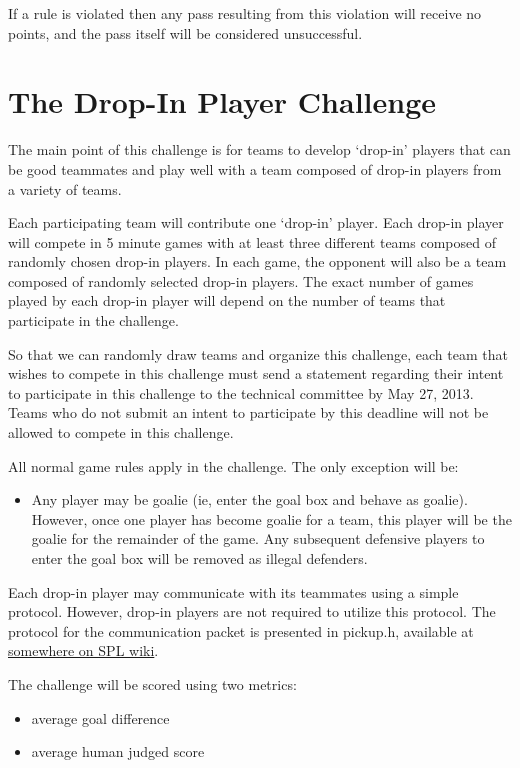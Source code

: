 \documentclass{article}
\begin{document}
If a rule is violated then any pass resulting from this violation will receive no points, and the pass itself will be considered unsuccessful.


\section{The Drop-In Player Challenge}
\label{sec:dropIn}
The main point of this challenge is for teams to develop `drop-in' players that can be good teammates and play well with a team composed of drop-in players from a variety of teams.

Each participating team will contribute one `drop-in' player.  Each drop-in player will compete in 5 minute games with at least three different teams composed of randomly chosen drop-in players.  In each game, the opponent will also be a team composed of randomly selected drop-in players.  The exact number of games played by each drop-in player will depend on the number of teams that participate in the challenge.

So that we can randomly draw teams and organize this challenge, each team that wishes to compete in this challenge must send a statement regarding their intent to participate in this challenge to the technical committee by May 27, 2013.  Teams who do not submit an intent to participate by this deadline will not be allowed to compete in this challenge.

All normal game rules apply in the challenge.  The only exception will be:
\begin{itemize}
\item Any player may be goalie (ie, enter the goal box and behave as goalie).  However, once one player has become goalie for a team, this player will be the goalie for the remainder of the game.  Any subsequent defensive players to enter the goal box will be removed as illegal defenders.
\end{itemize}

Each drop-in player may communicate with its teammates using a simple protocol.  However, drop-in players are not required to utilize this protocol.  The protocol for the communication packet is presented in pickup.h, available at \url{somewhere on SPL wiki}.

The challenge will be scored using two metrics: 
\begin{itemize}
\item average goal difference
\item average human judged score
\end{itemize}
\end{document}
